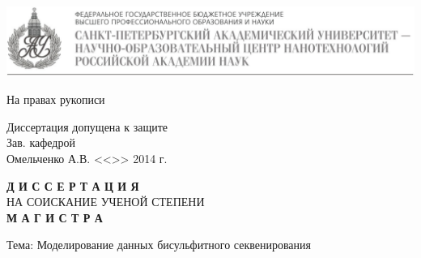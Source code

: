
\begin{titlepage}
  \thispagestyle{empty}

  \begin{center}
    \includegraphics[width=\textwidth]{images/au}
  \end{center}

  \small

  \begin{flushright}
    \begin{minipage}[t]{0.4\textwidth}%
      \begin{center}
        На правах рукописи

        \par\bigskip

        Диссертация допущена к защите\\
        Зав. кафедрой\\
        Омельченко А.В.
        \underline{\hspace{6cm}}
       <<\underline{\hspace{0.5cm}}>> \underline{\hspace{3cm}} 2014 г.
      \end{center}
    \end{minipage}
  \end{flushright}

  \par\bigskip
  \par\bigskip
  \par\bigskip
  \par\bigskip

  \begin{center}
    \textbf{\uppercase{Д И С С Е Р Т А Ц И Я}}\\
    \uppercase{НА СОИСКАНИЕ УЧЕНОЙ СТЕПЕНИ}\\
    \textbf{\uppercase{М А Г И С Т Р А}}

  \end{center}

  \par\bigskip
  \par\bigskip

  Тема:  Моделирование данных бисульфитного секвенирования


\end{titlepage}
